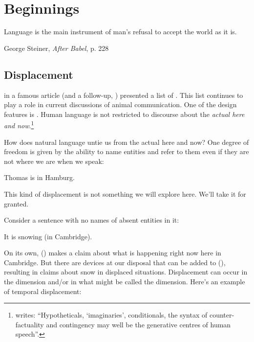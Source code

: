 
\chapter{Beginnings}\label{cha:beginnings_of_intensional_semantics} %

{\setlength{\epigraphwidth}{22ex}\epigraph{Language is the main instrument of
    man's refusal to accept the world as it is.}{George Steiner, \emph{After
      Babel}, p. 228}}


\minitoc

\section{Displacement} \label{sec:displacement}

\citet{hockett:origin:60} in a famous
article (and a follow-up, \citet{hockett:design:68}) presented a list of
. This list continues to play a role in
current discussions of animal communication. One of the design features is
. Human language is not restricted to discourse about the
\emph{actual here and now}.\footnote{\citet[226]{steiner:1998:babel} writes:
  ``Hypotheticals, `imaginaries', conditionals, the syntax of counter-factuality
  and contingency may well be the generative centres of human speech''.}

How does natural language untie us from the actual here and now? One degree of
freedom is given by the ability to name entities and refer to them even if they
are not where we are when we speak:

\ex Thomas is in Hamburg. \xe

This kind of displacement is not something we will explore here. We'll take it
for granted.

Consider a sentence with no names of absent entities in it:

\ex It is snowing (in Cambridge). \xe

On its own, (\lastx) makes a claim about what is happening right now here in
Cambridge. But there are devices at our disposal that can be added to (\lastx),
resulting in claims about snow in displaced situations. Displacement can occur
in the  dimension and/or in what might be called the
 dimension. Here's an
example of temporal displacement:

